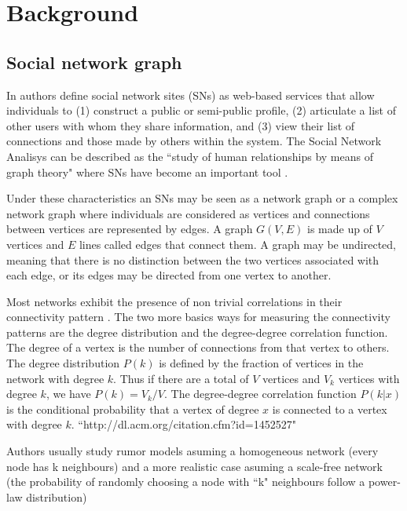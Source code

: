 \newpage

\section{Background}
%
%

\subsection{Social network graph}

In \cite{ellison2007social} authors define social network sites (SNs) \cite{ellison2007social} as web-based services that allow individuals to (1) construct a public or semi-public profile, (2) articulate a list of other users with whom they share information, and (3) view their list of connections and those made by others within the system. The Social Network Analisys can be described as the ``study of human relationships by means of graph theory" where SNs have become an important tool \cite{tsvetovat2011social}.

Under these characteristics an SNs may be seen as a network graph \cite{vlachos2005ngce} or a complex network graph \cite{barrat2008dynamical} where individuals are considered as vertices and connections between vertices are represented by edges. A graph $G(V,E)$ is made up of $V$ vertices and $E$ lines called edges that connect them. A graph may be undirected, meaning that there is no distinction between the two vertices associated with each edge, or its edges may be directed from one vertex to another.

Most networks exhibit the presence of non trivial correlations in their connectivity pattern \cite{serrano2007correlations}. The two more basics ways for measuring the connectivity patterns are the degree distribution and the degree-degree correlation function. The degree of a vertex is the number of connections from that vertex to others. The degree distribution $P(k)$ is defined by the fraction of vertices in the network with degree $k$. Thus if there are a total of $V$ vertices and $V_k$ vertices with degree $k$, we have $P(k)=V_k/V$. The degree-degree correlation function $P(k|x)$ is the conditional probability that a vertex of degree $x$ is connected to a vertex with degree $k$.
``http://dl.acm.org/citation.cfm?id=1452527"

Authors usually study rumor models asuming a homogeneous network \cite{zhao2011rumor,zhao2013sir,zhao2012sihr} (every node has k neighbours) and a more realistic case asuming a scale-free network \cite{moreno2004dynamics,nekovee2007theory,zhao2013rumor,isham2010stochastic, pastor2001epidemic} (the probability of randomly choosing a node with ``k" neighbours follow a power-law distribution)

